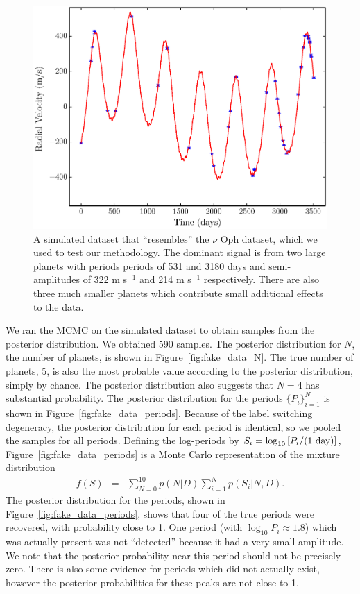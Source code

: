\documentclass[useAMS,usenatbib]{mn2e}
\begin{document}
\begin{figure}
\includegraphics[scale=0.4]{Figures/fake_data.eps}
\caption{A simulated dataset that ``resembles'' the $\nu$ Oph dataset, which
we used to test our methodology. The dominant signal is from two large
planets with periods periods of 531 and 3180 days and semi-amplitudes of
322 m s$^{-1}$ and 214 m s$^{-1}$ respectively. There are also three
much smaller planets which contribute small additional effects to the data.
\label{fig:fake_data}}
\end{figure}

We ran the MCMC on the simulated dataset to obtain samples from the
posterior distribution. We obtained 590 samples.
The posterior distribution for $N$, the number of
planets, is shown in Figure~\ref{fig:fake_data_N}. The true number of planets,
5, is also the most probable value according to the posterior distribution,
simply by chance. The posterior distribution also suggests that $N=4$ has
substantial probability.
The posterior distribution for the periods $\{P_i\}_{i=1}^N$ is shown in
Figure~\ref{fig:fake_data_periods}. Because of the label switching degeneracy,
the posterior distribution for each period is identical, so we pooled the
samples for all periods. Defining the log-periods by
$S_i =  \log_{10}\left[P_i/(\textnormal{1 day})\right]$,
Figure~\ref{fig:fake_data_periods} is a Monte Carlo representation
of the mixture distribution
\begin{eqnarray}
f(S) &=& \sum_{N=0}^{10} p(N | D)\sum_{i=1}^N p(S_i | N, D).
\end{eqnarray}
The posterior distribution for the periods, shown in
Figure~\ref{fig:fake_data_periods}, shows that four of the true periods were
recovered, with probability close to 1. One period (with $\log_{10}P_i \approx 1.8$)
which was actually present was not ``detected'' because it had a very small
amplitude. We note that the posterior probability near this period should not be
precisely zero. There is also some
evidence for periods which did not actually exist, however the posterior
probabilities for these peaks are not close to 1.
\end{document}
